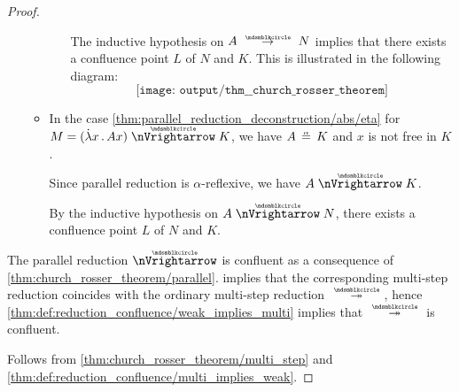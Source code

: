 \begin{proof}
\begin{itemize}
\begin{itemize}
\begin{itemize}
        The inductive hypothesis on \( A \pred N \) implies that there exists a confluence point \( L \) of \( N \) and \( K \). This is illustrated in the following diagram:
        \begin{equation*}
          \texttt{[image: output/thm\_\_church\_rosser\_theorem]}
        \end{equation*}
      \end{itemize}

      \item In the case \cref{thm:parallel_reduction_deconstruction/abs/eta} for \( M = (\qabs x A x) \ppred K \), we have \( A \aequiv K \) and \( x \) is not free in \( K \).

      Since parallel reduction is \( \alpha \)-reflexive, we have \( A \ppred K \).

      By the inductive hypothesis on \( A \ppred N \), there exists a confluence point \( L \) of \( N \) and \( K \).
    \end{itemize}
  \end{itemize}

   The parallel reduction \( {\ppred} \) is confluent as a consequence of \cref{thm:church_rosser_theorem/parallel}.  implies that the corresponding multi-step reduction coincides with the ordinary multi-step reduction \( {\pred*} \), hence \cref{thm:def:reduction_confluence/weak_implies_multi} implies that \( {\pred*} \) is confluent.

   Follows from \cref{thm:church_rosser_theorem/multi_step} and \cref{thm:def:reduction_confluence/multi_implies_weak}.
\end{proof}
